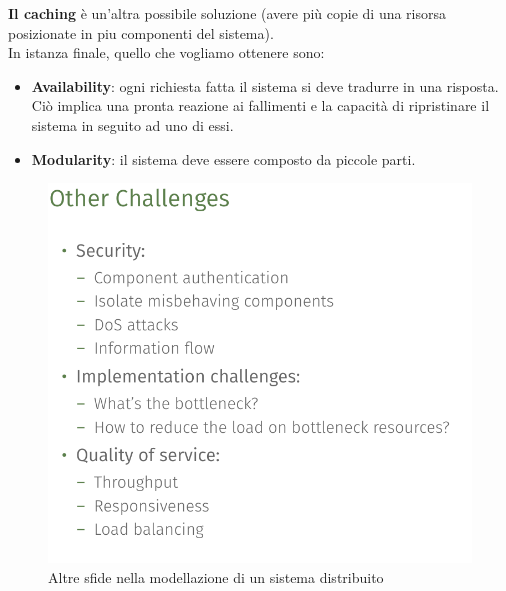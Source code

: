 \documentclass[12pt]{article}
\begin{document}
		\textbf{Il caching } è un'altra possibile soluzione (avere più copie di una risorsa posizionate in piu componenti del sistema).\\
		In istanza finale, quello che vogliamo ottenere sono:
		\begin{itemize}
			\item \textbf{Availability}: ogni richiesta fatta il sistema si deve tradurre in una risposta. Ciò implica una pronta reazione ai fallimenti e la capacità di ripristinare il sistema in seguito ad uno di essi.
			\item \textbf{Modularity}: il sistema deve essere composto da piccole parti.
		\end{itemize}
		\begin{figure}[h!]
			\centering
			\includegraphics[scale=0.30]{img/other.png}
			\caption{Altre sfide nella modellazione di un sistema distribuito}
		\end{figure}
	
\end{document}
